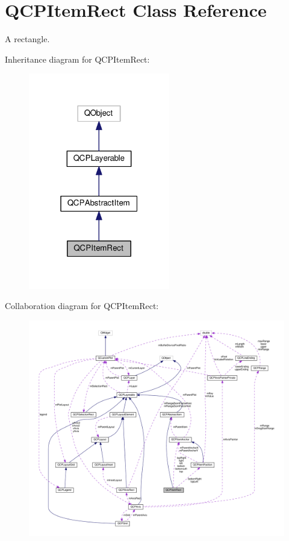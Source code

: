 \hypertarget{classQCPItemRect}{}\section{Q\+C\+P\+Item\+Rect Class Reference}
\label{classQCPItemRect}


A rectangle.  




Inheritance diagram for Q\+C\+P\+Item\+Rect\+:
\nopagebreak
\begin{figure}[H]
\begin{center}
\leavevmode
\includegraphics[width=175pt]{classQCPItemRect__inherit__graph}
\end{center}
\end{figure}


Collaboration diagram for Q\+C\+P\+Item\+Rect\+:
\nopagebreak
\begin{figure}[H]
\begin{center}
\leavevmode
\includegraphics[width=350pt]{classQCPItemRect__coll__graph}
\end{center}
\end{figure}
